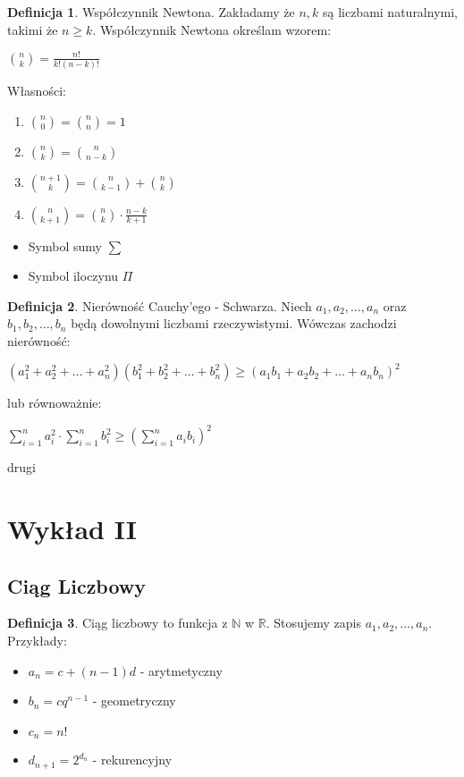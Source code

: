 \documentclass{article}
\theoremstyle{definition}
\newtheorem{de}{Definicja}[subsection]
\theoremstyle{definition}
\theoremstyle{definition}
\theoremstyle{definition}
\begin{document}
\begin{de}
    Współczynnik Newtona. Zakładamy że $n,k$ są liczbami naturalnymi,
    takimi że $n\geq k$. Współczynnik Newtona określam wzorem:
    \begin{center}
        $\binom{n}{k}=\frac{n!}{k!(n-k)!}$
    \end{center}
    Własności:
    \begin{enumerate}
        \item $\binom{n}{0}=\binom{n}{n}=1$
        \item $\binom{n}{k}=\binom{n}{n-k}$
        \item $\binom{n+1}{k}=\binom{n}{k-1}+\binom{n}{k}$
        \item $\binom{n}{k+1}=\binom{n}{k}\cdot \frac{n-k}{k+1}$
    \end{enumerate}
\end{de}

\begin{itemize}
    \item Symbol sumy $\sum$
    \item Symbol iloczynu $\Pi$
\end{itemize}

\begin{de}
    Nierówność Cauchy'ego - Schwarza. Niech $a_1, a_2, \dots, a_n$ oraz $b_1, b_2, \dots, b_n$ będą dowolnymi liczbami rzeczywistymi.
    Wówczas zachodzi nierówność:
    \begin{center}
        $(a_1^2+a_2^2+\dots+a_n^2)(b_1^2+b_2^2+\dots+b_n^2)\geq(a_1b_1+a_2b_2+\dots+a_nb_n)^2$
    \end{center}
    lub równoważnie:
    \begin{center}
        $\sum_{i=1}^{n} a_i^2 \cdot \sum_{i=1}^{n} b_i^2 \geq \left(\sum_{i=1}^{n} a_ib_i\right)^2$
    \end{center}
\end{de}
drugi
\section{Wykład II}

\subsection{Ciąg Liczbowy}

\begin{de}
    Ciąg liczbowy to funkcja z $\mathbb{N}$ w $\mathbb{R}$. Stosujemy zapis $a_1,a_2,\dots,a_n$. Przykłady:
    \begin{itemize}
        \item $a_n=c+(n-1)d$ - arytmetyczny
        \item $b_n=cq^{n-1}$ - geometryczny
        \item $c_n=n!$
        \item $d_{n+1}=2^{d_n}$ - rekurencyjny
    \end{itemize}
\end{de}
\end{document}
